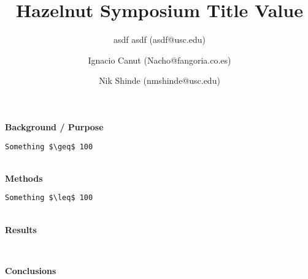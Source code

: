 \documentclass[11pt]{article}
\title{\vspace{-1cm}Hazelnut Symposium Title Value
}
\author[]{asdf asdf (asdf@usc.edu)}\author[]{Ignacio Canut (Nacho@fangoria.co.es)}\author[]{Nik Shinde (nmshinde@usc.edu)}
\affil[]{}
\date{}
\begin{document}
\maketitle
\thispagestyle{fancyfirst}
{\bfseries\large Background / Purpose}
\begin{lstlisting}[mathescape]
Something $\geq$ 100
\end{lstlisting}
\hfill \\
{\bfseries\large Methods}
\begin{lstlisting}[mathescape]
Something $\leq$ 100
\end{lstlisting}
\hfill \\
{\bfseries\large Results}
\begin{lstlisting}[mathescape]

\end{lstlisting}
\hfill \\
{\bfseries\large Conclusions}
\begin{lstlisting}[mathescape]

\end{lstlisting}
\hfill \\
\end{document}
